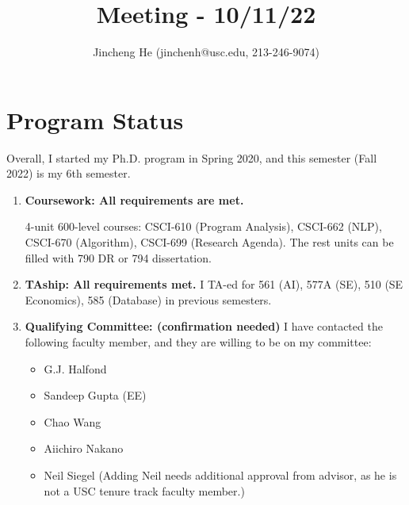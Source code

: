 \documentclass{article}
\title{Meeting - 10/11/22}
\author{Jincheng He (jinchenh@usc.edu, 213-246-9074)}
\date{}
\begin{document}
\maketitle

\section*{Program Status}
Overall, I started my Ph.D. program in Spring 2020, and this semester (Fall 2022) is my 6th semester. 
\begin{enumerate}

\item \textbf{Coursework: All requirements are met.} 

4-unit 600-level courses: CSCI-610 (Program Analysis), CSCI-662 (NLP), CSCI-670 (Algorithm), CSCI-699 (Research Agenda).
The rest units can be filled with 790 DR or 794 dissertation.

\item \textbf{TAship: All requirements met.} I TA-ed for 561 (AI), 577A (SE), 510 (SE Economics), 585 (Database) in previous semesters.

\item \textbf{Qualifying Committee: \color{red}(confirmation needed)} I have contacted the following faculty member, and they are willing to be on my committee:

\begin{itemize}
    \item G.J. Halfond
    \item Sandeep Gupta (EE)
    \item Chao Wang
    \item Aiichiro Nakano 
    \item Neil Siegel (Adding Neil needs additional approval from advisor, as he is not a USC tenure track faculty member.)
\end{itemize}
\end{enumerate}
\end{document}
